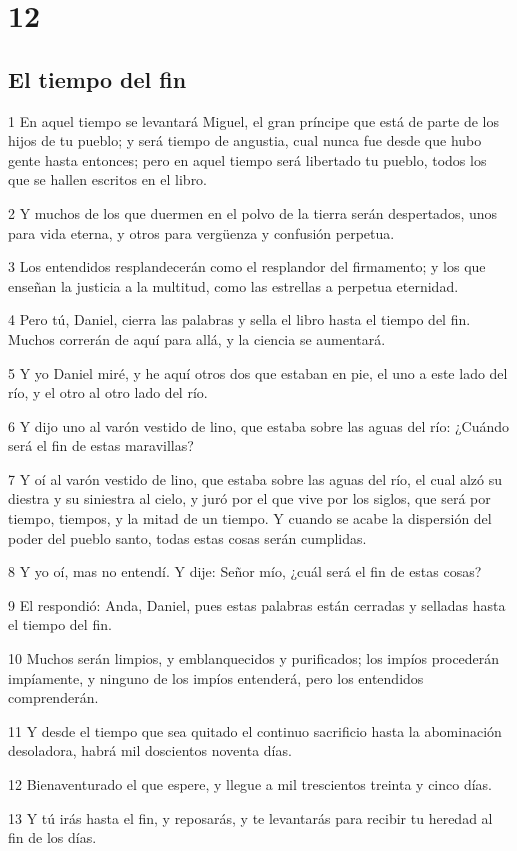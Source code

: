 \chapter{12}

\section*{El tiempo del fin}

\par 1 En aquel tiempo se levantará Miguel, el gran príncipe que está de parte de los hijos de tu pueblo; y será tiempo de angustia, cual nunca fue desde que hubo gente hasta entonces; pero en aquel tiempo será libertado tu pueblo, todos los que se hallen escritos en el libro.
\par 2 Y muchos de los que duermen en el polvo de la tierra serán despertados, unos para vida eterna, y otros para vergüenza y confusión perpetua. 
\par 3 Los entendidos resplandecerán como el resplandor del firmamento; y los que enseñan la justicia a la multitud, como las estrellas a perpetua eternidad.
\par 4 Pero tú, Daniel, cierra las palabras y sella el libro hasta el tiempo del fin. Muchos correrán de aquí para allá, y la ciencia se aumentará.
\par 5 Y yo Daniel miré, y he aquí otros dos que estaban en pie, el uno a este lado del río, y el otro al otro lado del río.
\par 6 Y dijo uno al varón vestido de lino, que estaba sobre las aguas del río: ¿Cuándo será el fin de estas maravillas?
\par 7 Y oí al varón vestido de lino, que estaba sobre las aguas del río, el cual alzó su diestra y su siniestra al cielo, y juró por el que vive por los siglos, que será por tiempo, tiempos, y la mitad de un tiempo. Y cuando se acabe la dispersión del poder del pueblo santo, todas estas cosas serán cumplidas.
\par 8 Y yo oí, mas no entendí. Y dije: Señor mío, ¿cuál será el fin de estas cosas?
\par 9 El respondió: Anda, Daniel, pues estas palabras están cerradas y selladas hasta el tiempo del fin.
\par 10 Muchos serán limpios, y emblanquecidos y purificados; los impíos procederán impíamente, y ninguno de los impíos entenderá, pero los entendidos comprenderán.
\par 11 Y desde el tiempo que sea quitado el continuo sacrificio hasta la abominación desoladora, habrá mil doscientos noventa días.
\par 12 Bienaventurado el que espere, y llegue a mil trescientos treinta y cinco días.
\par 13 Y tú irás hasta el fin, y reposarás, y te levantarás para recibir tu heredad al fin de los días.

